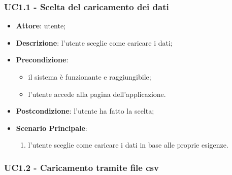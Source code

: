     \subsubsection{UC1.1 - Scelta del caricamento dei dati}
    \label{uc1.1}
    
    \begin{itemize}
    \item \textbf{Attore}: utente;
    \item \textbf{Descrizione}: l'utente sceglie come caricare i dati;
    \item \textbf{Precondizione}:
    \begin{itemize}
        \item il sistema è funzionante e raggiungibile;
        \item l'utente accede alla pagina dell'applicazione.
    \end{itemize}
    \item \textbf{Postcondizione}: l'utente ha fatto la scelta;
    \item \textbf{Scenario Principale}: 
        \begin{enumerate}
            \item l'utente sceglie come caricare i dati in base alle proprie esigenze.
        \end{enumerate}
    \end{itemize}
    
    \subsubsection{UC1.2 - Caricamento tramite file csv}
    \label{uc1.2}
    
